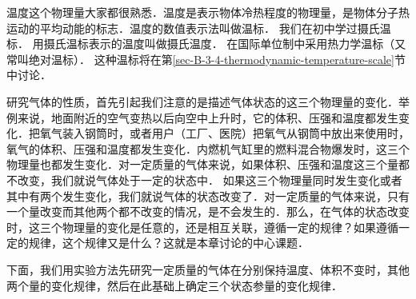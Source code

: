 温度这个物理量大家都很熟悉．温度是表示物体冷热程度的物理量，是物体分子热运动的平均动能的标志．温度的数值表示法叫做温标．
我们在初中学过摄氏温标．
用摄氏温标表示的温度叫做摄氏温度．
在国际单位制中采用热力学温标（又常叫绝对温标）．
这种温标将在第\ref{sec-B-3-4-thermodynamic-temperature-scale}节中讨论．

研究气体的性质，首先引起我们注意的是描述气体状态的这三个物理量的变化．举例来说，地面附近的空气变热以后向空中上升时，它的体积、压强和温度都发生变化．把氧气装入钢筒时，或者用户（工厂、医院）把氧气从钢筒中放出来使用时，氧气的体积、压强和温度都发生变化．内燃机气缸里的燃料混合物爆发时，这三个物理量也都发生变化．对一定质量的气体来说，如果体积、压强和温度这三个量都不改变，我们就说气体处于一定的状态中．
如果这三个物理量同时发生变化或者其中有两个发生变化，我们就说气体的状态改变了．对一定质量的气体来说，只有一个量改变而其他两个都不改变的情况，是不会发生的．那么，在气体的状态改变时，这三个物理量的变化是任意的，还是相互关联，遵循一定的规律？如果遵循一定的规律，这个规律又是什么？这就是本章讨论的中心课题．

下面，我们用实验方法先研究一定质量的气体在分别保持温度、体积不变时，其他两个量的变化规律，然后在此基础上确定三个状态参量的变化规律．



